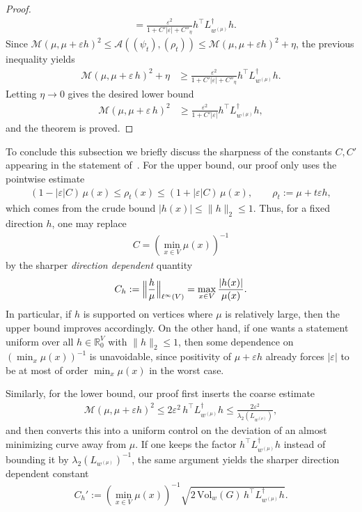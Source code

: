 \documentclass[11pt,a4paper]{article}
\newcommand{\Maas}{\mathcal{M}}
\newcommand{\Vol}{\mathrm{Vol}}
\begin{document}
\begin{proof}
\begin{align*}
            &= \frac{\varepsilon^2}{1 + C'|\varepsilon| + C''_{\eta}} h^\top L_{w^{(\mu)}}^{\dagger} h.
        \end{align*}
    Since $\Maas(\mu,\mu+\varepsilon h)^2 \leq \mathcal{A}((\psi_t),(\rho_t)) \leq \Maas(\mu,\mu+\varepsilon h)^2 + \eta$, the previous inequality yields
        \begin{align*}
            \Maas(\mu, \mu+\varepsilon \, h)^2 + \eta &\geq \frac{\varepsilon^2}{1 + C'|\varepsilon| + C''_{\eta}} h^\top L_{w^{(\mu)}}^{\dagger} h.
        \end{align*}
    Letting $\eta\to 0$ gives the desired lower bound
        \begin{align*}
            \Maas(\mu, \mu+\varepsilon \, h)^2 &\geq \frac{\varepsilon^2}{1 + C'|\varepsilon|} h^\top L_{w^{(\mu)}}^{\dagger} h,
        \end{align*}
    and the theorem is proved.
\end{proof}

To conclude this subsection we briefly discuss the sharpness of the constants $C, C'$ appearing in the statement of~. For the upper bound, our proof only uses the pointwise estimate
    \begin{align*}
        (1-|\varepsilon|C)\,\mu(x)\leq \rho_t(x)\leq (1+|\varepsilon|C)\,\mu(x),\qquad \rho_t:=\mu+t\varepsilon h,
    \end{align*}
which comes from the crude bound $|h(x)|\leq \|h\|_2\leq 1$. Thus, for a fixed direction $h$, one may replace
    \begin{align*}
        C=\left(\min_{x\in V}\mu(x)\right)^{-1}
    \end{align*}
by the sharper \emph{direction dependent} quantity
    \begin{align*}
        C_h:=\Bigl\|\frac{h}{\mu}\Bigr\|_{\ell^\infty(V)} =\max_{x\in V}\frac{|h(x)|}{\mu(x)}.
    \end{align*}
In particular, if $h$ is supported on vertices where $\mu$ is relatively large, then the upper bound improves accordingly. On the other hand, if one wants a statement uniform over all $h\in\mathbb{R}^V_0$ with $\|h\|_2\leq 1$, then some dependence on $(\min_x\mu(x))^{-1}$ is unavoidable, since positivity of $\mu+\varepsilon h$ already forces $|\varepsilon|$ to be at most of order $\min_x\mu(x)$ in the worst case.

Similarly, for the lower bound, our proof first inserts the coarse estimate
    \begin{align*}
        \Maas(\mu,\mu+\varepsilon h)^2 \leq 2\varepsilon^2\,h^\top L_{w^{(\mu)}}^\dagger h \leq \frac{2\varepsilon^2}{\lambda_2(L_{w^{(\mu)}})},
    \end{align*}
and then converts this into a uniform control on the deviation of an almost minimizing curve away from $\mu$. If one keeps the factor $h^\top L_{w^{(\mu)}}^\dagger h$ instead of bounding it by $\lambda_2(L_{w^{(\mu)}})^{-1}$, the same argument yields the sharper direction dependent constant
    \begin{align*}
        C_h' := \left(\min_{x\in V}\mu(x)\right)^{-1} \sqrt{2\,\Vol_w(G)\,h^\top L_{w^{(\mu)}}^\dagger h}.
    \end{align*}
\end{document}
